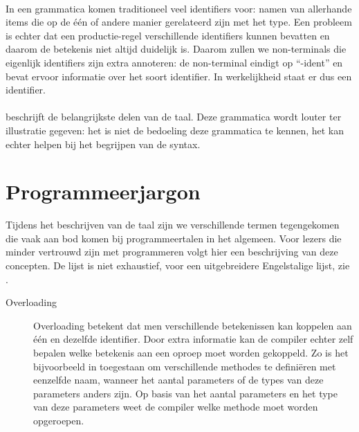 \paragraph{}
In een grammatica komen traditioneel veel identifiers voor: namen van allerhande items die op de \'e\'en of andere manier gerelateerd zijn met het type. Een probleem is echter dat een productie-regel verschillende identifiers kunnen bevatten en daarom de betekenis niet altijd duidelijk is. Daarom zullen we non-terminals die eigenlijk identifiers zijn extra annoteren: de non-terminal eindigt op ``-ident'' en bevat ervoor informatie over het soort identifier. In werkelijkheid staat er dus een identifier.

\paragraph{}
 beschrijft de belangrijkste delen van de \tvhdl{} taal. Deze grammatica wordt louter ter illustratie gegeven: het is niet de bedoeling deze grammatica te kennen, het kan echter helpen bij het begrijpen van de \tvhdl{} syntax.

% 
\section{Programmeerjargon}
Tijdens het beschrijven van de \tvhdl{} taal zijn we verschillende termen tegengekomen die vaak aan bod komen bij programmeertalen in het algemeen. Voor lezers die minder vertrouwd zijn met programmeren volgt hier een beschrijving van deze concepten. De lijst is niet exhaustief, voor een uitgebreidere Engelstalige lijst, zie \cite{vanonsemglossary}.

\begin{description}
 \item [Overloading] Overloading betekent dat men verschillende betekenissen kan koppelen aan \'e\'en en dezelfde identifier. Door extra informatie kan de compiler echter zelf bepalen welke betekenis aan een oproep moet worden gekoppeld. Zo is het bijvoorbeeld in \tjava{} toegestaan om verschillende methodes te defini\"eren met eenzelfde naam, wanneer het aantal parameters of de types van deze parameters anders zijn. Op basis van het aantal parameters en het type van deze parameters weet de \tjava{} compiler welke methode moet worden opgeroepen.
\end{description}